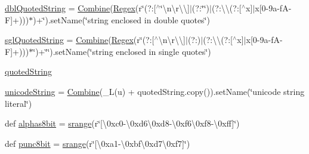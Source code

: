 \begin{DoxyCompactItemize}
\item 
\hyperlink{namespacesetuptools_1_1__vendor_1_1pyparsing_ac4d6fae3a4931690edcafde787349ca3}{dbl\+Quoted\+String} = \hyperlink{classsetuptools_1_1__vendor_1_1pyparsing_1_1_combine}{Combine}(\hyperlink{classsetuptools_1_1__vendor_1_1pyparsing_1_1_regex}{Regex}(r\textquotesingle{}\char`\"{}(?\+:\mbox{[}$^\wedge$\char`\"{}\textbackslash{}n\textbackslash{}r\textbackslash{}\textbackslash{}\mbox{]}$\vert$(?\+:\char`\"{}\char`\"{})$\vert$(?\+:\textbackslash{}\textbackslash{}(?\+:\mbox{[}$^\wedge$x\mbox{]}$\vert$x\mbox{[}0-\/9a-\/f\+A-\/\+F\mbox{]}+)))$\ast$\textquotesingle{})+\textquotesingle{}\char`\"{}\textquotesingle{}).\+set\+Name(\char`\"{}string enclosed in double quotes\char`\"{})
\item 
\hyperlink{namespacesetuptools_1_1__vendor_1_1pyparsing_a89ba298f33299af7c19f1ef5d37279b2}{sgl\+Quoted\+String} = \hyperlink{classsetuptools_1_1__vendor_1_1pyparsing_1_1_combine}{Combine}(\hyperlink{classsetuptools_1_1__vendor_1_1pyparsing_1_1_regex}{Regex}(r\char`\"{}\textquotesingle{}(?\+:\mbox{[}$^\wedge$\textquotesingle{}\textbackslash{}n\textbackslash{}r\textbackslash{}\textbackslash{}\mbox{]}$\vert$(?\+:\textquotesingle{}\textquotesingle{})$\vert$(?\+:\textbackslash{}\textbackslash{}(?\+:\mbox{[}$^\wedge$x\mbox{]}$\vert$x\mbox{[}0-\/9a-\/f\+A-\/\+F\mbox{]}+)))$\ast$\char`\"{})+\char`\"{}\textquotesingle{}\char`\"{}).\+set\+Name(\char`\"{}string enclosed in single quotes\char`\"{})
\item 
\hyperlink{namespacesetuptools_1_1__vendor_1_1pyparsing_a3601fc46de4b69d173c0a1b5afe65228}{quoted\+String}
\item 
\hyperlink{namespacesetuptools_1_1__vendor_1_1pyparsing_a9cd194f735bf68fcbebb478516024d39}{unicode\+String} = \hyperlink{classsetuptools_1_1__vendor_1_1pyparsing_1_1_combine}{Combine}(\+\_\+L(\textquotesingle{}u\textquotesingle{}) + quoted\+String.\+copy()).set\+Name(\char`\"{}unicode string literal\char`\"{})
\item 
def \hyperlink{namespacesetuptools_1_1__vendor_1_1pyparsing_a5504127ce766bfceee5493353831eb25}{alphas8bit} = \hyperlink{namespacesetuptools_1_1__vendor_1_1pyparsing_a61c16ab7d60fc8f9bf0d3af8751c4fe6}{srange}(r\char`\"{}\mbox{[}\textbackslash{}0xc0-\/\textbackslash{}0xd6\textbackslash{}0xd8-\/\textbackslash{}0xf6\textbackslash{}0xf8-\/\textbackslash{}0xff\mbox{]}\char`\"{})
\item 
def \hyperlink{namespacesetuptools_1_1__vendor_1_1pyparsing_ad4c557a1138130bd5707f9c21db386e8}{punc8bit} = \hyperlink{namespacesetuptools_1_1__vendor_1_1pyparsing_a61c16ab7d60fc8f9bf0d3af8751c4fe6}{srange}(r\char`\"{}\mbox{[}\textbackslash{}0xa1-\/\textbackslash{}0xbf\textbackslash{}0xd7\textbackslash{}0xf7\mbox{]}\char`\"{})

\end{DoxyCompactItemize}
